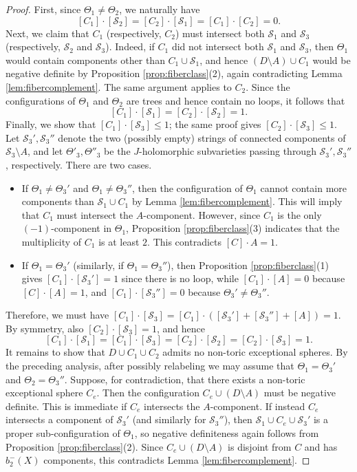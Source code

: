 \documentclass[11pt]{article}
\theoremstyle{definition}
\theoremstyle{remark}
\newcommand{\st}{\mathcal{S}}
\begin{document}
\begin{proof}
  First, since $\Theta_1\neq \Theta_2$, we naturally have
  \[
    [C_1]\cdot[\st_2]=[C_2]\cdot[\st_1]=[C_1]\cdot [C_2]=0.
  \]
  Next, we claim that $C_1$ (respectively, $C_2$) must intersect both $\st_1$ and $\st_3$ (respectively, $\st_2$ and $\st_3$). Indeed, if $C_1$ did not intersect both $\st_1$ and $\st_3$, then $\Theta_1$ would contain components other than $C_1\cup \st_1$, and hence $(D\setminus A)\cup C_1$ would be negative definite by Proposition \ref{prop:fiberclass}(2), again contradicting Lemma \ref{lem:fibercomplement}. The same argument applies to $C_2$. Since the configurations of $\Theta_1$ and $\Theta_2$ are trees and hence contain no loops, it follows that
  \[
    [C_1]\cdot[\st_1]=[C_2]\cdot[\st_2]=1.
  \]
  Finally, we show that $[C_1]\cdot [\st_3]\leq 1$; the same proof gives $[C_2]\cdot [\st_3]\leq 1$. Let $\st_3',\st_3''$ denote the two (possibly empty) strings of connected components of $\st_3\setminus A$, and let $\Theta'_3,\Theta''_3$ be the $J$-holomorphic subvarieties passing through $\st_3',\st_3''$, respectively. There are two cases.
  \begin{itemize}[nosep]
   \item If $\Theta_1\neq \Theta_3'$ and $\Theta_1\neq \Theta_3''$, then the configuration of $\Theta_1$ cannot contain more components than $\st_1\cup C_1$ by Lemma \ref{lem:fibercomplement}. This will imply that $C_1$ must intersect the $A$-component. However, since $C_1$ is the only $(-1)$-component in $\Theta_1$, Proposition \ref{prop:fiberclass}(3) indicates that the multiplicity of $C_1$ is at least $2$. This contradicts $[C]\cdot A=1$.
    \item If $\Theta_1=\Theta_3'$ (similarly, if $\Theta_1=\Theta_3''$), then Proposition \ref{prop:fiberclass}(1) gives $[C_1]\cdot [\st_3']=1$ since there is no loop, while $[C_1]\cdot [A]=0$ because $[C]\cdot [A]=1$, and $[C_1]\cdot [\st_3'']=0$ because $\Theta_3'\neq \Theta_3''$.
  \end{itemize}
  Therefore, we must have $[C_1]\cdot [\st_3]=[C_1]\cdot([\st_3']+[\st_3'']+[A])=1$. By symmetry, also $[C_2]\cdot [\st_3]=1$, and hence
  \[
    [C_1]\cdot [\st_1]=[C_1]\cdot [\st_3]=[C_2]\cdot [\st_2]=[C_2]\cdot [\st_3]=1.
  \]
  It remains to show that $D\cup C_1\cup C_2$ admits no non-toric exceptional spheres. By the preceding analysis, after possibly relabeling we may assume that $\Theta_1=\Theta_3'$ and $\Theta_2=\Theta_3''$. Suppose, for contradiction, that there exists a non-toric exceptional sphere $C_e$. Then the configuration $C_e\cup (D\setminus A)$ must be negative definite. This is immediate if $C_e$ intersects the $A$-component. If instead $C_e$ intersects a component of $\st_3'$ (and similarly for $\st_3''$), then $\st_1\cup C_e\cup\st_3'$ is a proper sub-configuration of $\Theta_1$, so negative definiteness again follows from Proposition \ref{prop:fiberclass}(2). Since $C_e\cup (D\setminus A)$ is disjoint from $C$ and has $b_2^-(X)$ components, this contradicts Lemma \ref{lem:fibercomplement}.

\end{proof}
\end{document}
